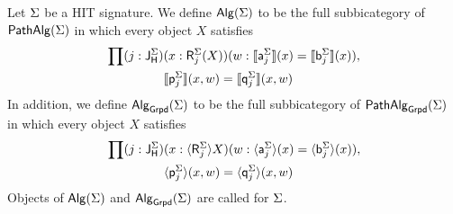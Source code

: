 \begin{definition}
\label{def:bicat_grpd}
Let $\sign$ be a HIT signature.
We define $\algM(\sign)$ to be the full subbicategory of $\pathalgM(\sign)$
in which every object $X$ satisfies
\begin{equation*}
\begin{split}
\prod
(j : \homotlabel[\sign]) &(x : \polyAct{\homotpointarg[\sign]_j}{X}) (w : \semE{\pathargleft[\sign]_j}(x) = \semE{\pathargright[\sign]_j}(x)),\\
&\semH{\homotleft[\sign]_j}(x, w) = \semH{\homotright[\sign]_j}(x, w)
\end{split}
\end{equation*}
In addition, we define $\algG{\sign}$ to be the full subbicategory of $\pathalgG{\sign} $
in which every object $X$ satisfies
\begin{equation*}
\begin{split}
\prod
(j : \homotlabel[\sign]) &(x : \semPG{\homotpointarg[\sign]_j}{X}) (w : \semEG{\pathargleft[\sign]_j}(x) = \semEG{\pathargright[\sign]_j}(x)),\\
&\semHG{\homotleft[\sign]_j}(x, w) = \semHG{\homotright[\sign]_j}(x, w)
\end{split}
\end{equation*}
Objects of $\algM(\sign)$ and $\algG{\sign}$ are called  for $\sign$.
\end{definition}

